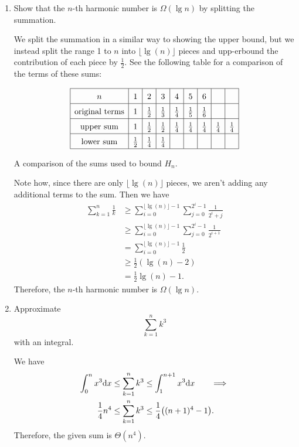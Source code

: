 \documentclass[AppendixA]{subfiles}
\begin{document}
\begin{enumerate}[leftmargin=\labelsep]
		\item Show that the $n$-th harmonic number is $\Omega(\lg n)$ by splitting the summation.
		\begin{answer}
			We split the summation in a similar way to showing the upper bound, but we instead split the range 1 to $n$ into $\lfloor \lg(n) \rfloor$ pieces and upp-erbound the contribution of each piece by $\frac{1}{2}$. See the following table for a comparison of the terms of these sums:
			\begin{table}[H]
				\[
					\renewcommand{\arraystretch}{1.5}
					\begin{array}{|c|c|c|c|c|c|c|c|c|}
						\hline
						n & 1 & 2 & 3 & 4 & 5 & 6 & & \\\hline
						\text{original terms} & 1 & \frac{1}{2} & \frac{1}{3} & \frac{1}{4} & \frac{1}{5} & \frac{1}{6} & & \\\hline
						\text{upper sum} & 1 & \frac{1}{2} & \frac{1}{2} & \frac{1}{4} & \frac{1}{4} & \frac{1}{4} & \frac{1}{4} & \frac{1}{4} \\\hline
						\text{lower sum} & \frac{1}{2} & \frac{1}{4} & \frac{1}{4} & & & & &\\\hline
					\end{array}
				\]
				\caption{A comparison of the sums used to bound $H_n$.}
			\end{table}

			Note how, since there are only $\lfloor \lg(n) \rfloor$ pieces, we aren't adding any additional terms to the sum. Then we have
			\begin{align*}
				\sum_{k = 1}^n \frac{1}{k} &\geq \sum_{i = 0}^{\lfloor \lg(n) \rfloor - 1} \sum_{j = 0}^{2^i - 1} \frac{1}{2^i + j}\\
					&\geq \sum_{i = 0}^{\lfloor \lg(n) \rfloor - 1} \sum_{j = 0}^{2^i - 1} \frac{1}{2^{i + 1}}\\
					&= \sum_{i = 0}^{\lfloor \lg(n) \rfloor - 1} \frac{1}{2}\\
					&\geq \frac{1}{2}(\lg(n) - 2)\\
					&= \frac{1}{2} \lg(n) - 1.
			\end{align*}
			Therefore, the $n$-th harmonic number is $\Omega(\lg n)$.
		\end{answer}
		
		\item Approximate
		\[
			\sum_{k = 1}^n k^3
		\]
		with an integral.
		\begin{answer}
			We have
			\begin{align*}
				\int_0^n x^3 \dd x &\leq \sum_{k = 1}^n k^3 \leq \int_1^{n+1} x^3 \dd x \tag*{$\implies$}\\
				\frac{1}{4}n^4     &\leq \sum_{k = 1}^n k^3 \leq \frac{1}{4}\qty((n+1)^4 - 1).
			\end{align*}
			Therefore, the given sum is $\Theta(n^4)$.
		\end{answer}
		

\end{enumerate}
\end{document}
